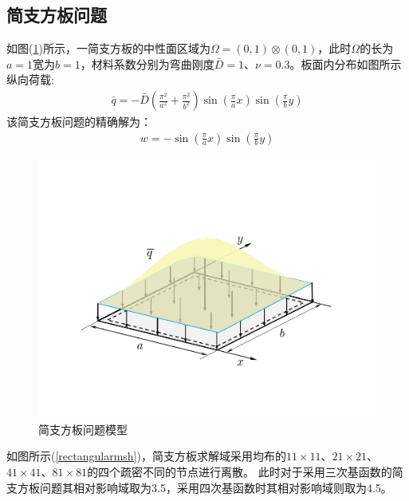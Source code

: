 \subsection{简支方板问题}
如图(\ref{rectangular})所示，一简支方板的中性面区域为$\Omega=(0,1)\otimes(0,1)$，此时$\Omega$的长为$a=1$宽为$b=1$，材料系数分别为弯曲刚度$\bar{D}=1$、$\nu=0.3$。板面内分布如图所示纵向荷载:
\begin{equation}
\begin{split}
    \bar q=-\bar D(\frac{\pi^2}{a^2}+\frac{\pi^2}{b^2})\sin(\frac{\pi}{a}x)\sin(\frac{\pi}{b}y)
\end{split}
\end{equation}
该简支方板问题的精确解为：
\begin{equation}
\begin{split}
    w=-\sin(\frac{\pi}{a}x)\sin(\frac{\pi}{b}y)
\end{split}
\end{equation}
\newpage
\begin{figure}[H]
\centering
    \includegraphics[scale=0.7]{figure/PHR/R/rectangular.png}
    \caption{简支方板问题模型}\label{rectangular}
\end{figure}
如图所示(\ref{rectangularmsh})，简支方板求解域采用均布的$11\times 11$、$21\times 21$、$41\times 41$、$81\times 81$的四个疏密不同的节点进行离散。
此时对于采用三次基函数的简支方板问题其相对影响域取为3.5，采用四次基函数时其相对影响域则取为4.5。\par
